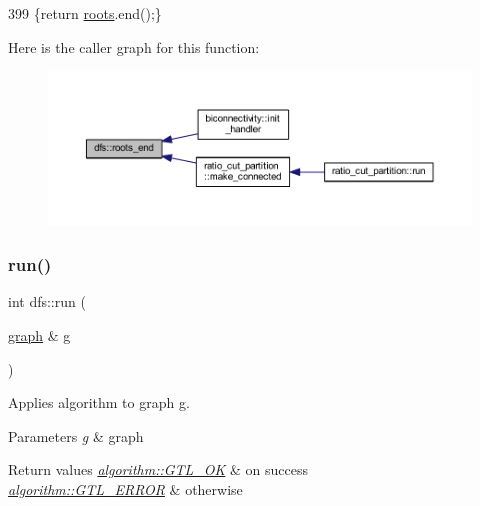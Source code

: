 \begin{DoxyCode}
399     \{\textcolor{keywordflow}{return} \mbox{\hyperlink{classdfs_a0bbd5cb8df26c891b74dadd84b46a06b}{roots}}.end();\}
\end{DoxyCode}
Here is the caller graph for this function\+:
\nopagebreak
\begin{figure}[H]
\begin{center}
\leavevmode
\includegraphics[width=350pt]{classdfs_ae1a61d8c2d8d99059cab410f766ec73f_icgraph}
\end{center}
\end{figure}
\mbox{\label{classdfs_af0863b8974d5fd58cd0375c78ed8163b}} 
\subsubsection{\texorpdfstring{run()}{run()}}
{\footnotesize\ttfamily int dfs\+::run (\begin{DoxyParamCaption}\item[{\mbox{\hyperlink{classgraph}{graph}} \&}]{g }\end{DoxyParamCaption})\hspace{0.3cm}{\ttfamily [virtual]}}



Applies algorithm to graph g. 


\begin{DoxyParams}{Parameters}
{\em g} & graph \\
\hline
\end{DoxyParams}

\begin{DoxyRetVals}{Return values}
{\em \mbox{\hyperlink{classalgorithm_af1a0078e153aa99c24f9bdf0d97f6710a5114c20e4a96a76b5de9f28bf15e282b}{algorithm\+::\+G\+T\+L\+\_\+\+OK}}} & on success \\
\hline
{\em \mbox{\hyperlink{classalgorithm_af1a0078e153aa99c24f9bdf0d97f6710a6fcf574690bbd6cf710837a169510dd7}{algorithm\+::\+G\+T\+L\+\_\+\+E\+R\+R\+OR}}} & otherwise \\
\hline
\end{DoxyRetVals}


